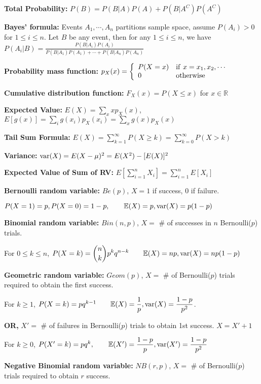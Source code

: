 \documentclass[10pt, a4paper]{article}
\newcommand{\E}{{\mathbb{E}}}
\newcommand{\var}{{\rm var}}
\newcommand{\disp}{\displaystyle}
\begin{document}
\begin{spacing}{1}
    {\bf Total Probability:} $P(B)=P(B|A)P(A)+P(B|A^C)P(A^C)$

    {\bf Bayes' formula:} Events $A_1,\cdots ,A_n$ partitions sample space, assume 
    $P(A_i)>0$ for $1\le i\le n$. Let $B$ be any event, then for any $1\le i\le n$, we have
    $\disp P(A_i|B)=\frac{P(B|A_i)P(A_i)}{P(B|A_1)P(A_1)+\cdots +P(B|A_n)P(A_n)}$

    \vspace{0.3in}
    {\bf Probability mass function:} $\disp p_X(x)=
    \left\{ \begin{array}{ll} 
        P(X=x) & {\rm if\ } x=x_1,x_2,\cdots \\ 0 & {\rm otherwise}
    \end{array} \right.$

    {\bf Cumulative distribution function:} $F_X(x)=P(X\le x)$ for $x\in \mathbb{R}$

    {\bf Expected Value:} $\disp E(X)=\sum_{x} xp_X(x)$, 
    $\disp E[g(x)]=\sum_{i}g(x_i)p_X(x_i)=\sum_x g(x)p_X(x)$

    {\bf Tail Sum Formula:} $\disp E(X)=\sum_{k=1}^{\infty} P(X\ge k)=\sum_{k=0}^{\infty}P(X>k)$

    {\bf Variance:} $\var (X)=E(X-\mu)^2=E(X^2)-[E(X)]^2$

    {\bf Expected Value of Sum of RV:} $\disp E\left[\sum_{i=1}^n X_i\right]
    =\sum_{i=1}^n E[X_i]$

    \newpage
    {\bf Bernoulli random variable:} $Be(p)$, $X=1$ if success, $0$ if failure. 

    $P(X=1)=p, P(X=0)=1-p,\qquad \E(X)=p, \var(X)=p(1-p)$

    {\bf Binomial random variable:} $Bin(n,p)$, $X=$ \# of successes in $n$ 
    Bernoulli($p$) trials.

    For $0\le k\le n$, $\disp P(X=k)={n\choose k} p^k q^{n-k}
    \qquad \E(X)=np, \var(X)=np(1-p)$

    {\bf Geometric random variable:} $Geom(p)$, $X=$ \# of Bernoulli($p$)
    trials required to obtain the first success.

    For $k\ge 1$, $P(X=k)=pq^{k-1}\qquad \E(X)=\dfrac{1}{p}, \var(X)=\dfrac{1-p}{p^2}$.

    {\bf OR, }$X'=$ \# of failures in Bernoulli($p$) trials to obtain 1st success.
    $X=X'+1$

    For $k\ge 0$, $P(X'=k)=pq^k,\qquad \E(X')=\dfrac{1-p}{p}, \var(X')=\dfrac{1-p}{p^2}$

    {\bf Negative Binomial random variable:} $NB(r,p)$, $X=$ \# of Bernoulli($p$) trials
    required to obtain $r$ success.


\end{spacing}
\end{document}
